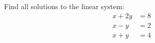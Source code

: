 Find all solutions to the linear system:
\begin{align*}
x + 2y &= 8\\
x - y &= 2\\
x + y &= 4
\end{align*}
